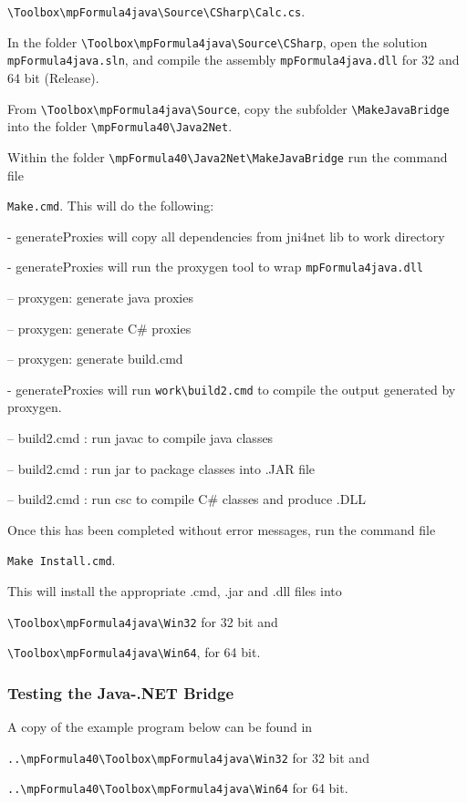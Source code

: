 \verb|\Toolbox\mpFormula4java\Source\CSharp\Calc.cs|.

\vpara
In the folder \verb|\Toolbox\mpFormula4java\Source\CSharp|, open the solution 
\verb|mpFormula4java.sln|, and compile the assembly \verb|mpFormula4java.dll| for 32 and 64 bit (Release). 

\vpara
From \verb|\Toolbox\mpFormula4java\Source|, copy the subfolder \verb|\MakeJavaBridge| into the folder \verb|\mpFormula40\Java2Net|.

\vpara
Within the folder \verb|\mpFormula40\Java2Net\MakeJavaBridge| run the command file 

\verb|Make.cmd|. This will do the following:

- generateProxies will copy all dependencies from jni4net lib to work directory

- generateProxies will run the proxygen tool to wrap \verb|mpFormula4java.dll|

-- proxygen: generate java proxies

-- proxygen: generate C\# proxies

-- proxygen: generate build.cmd

- generateProxies will run \verb|work\build2.cmd|  to compile the output generated by proxygen. 

-- build2.cmd : run javac to compile java classes

-- build2.cmd : run jar to package classes into .JAR file

-- build2.cmd : run csc to compile C\# classes and produce .DLL


\vpara
Once this has been completed without error messages, run the command file 

\verb|Make Install.cmd|.

This will install the appropriate .cmd, .jar and .dll files into

\verb|\Toolbox\mpFormula4java\Win32| for 32 bit and 

\verb|\Toolbox\mpFormula4java\Win64|, for 64 bit.




\subsubsection{Testing the Java-.NET Bridge}

A copy of the example program below can be found in 

\verb|..\mpFormula40\Toolbox\mpFormula4java\Win32| for 32 bit and 

\verb|..\mpFormula40\Toolbox\mpFormula4java\Win64| for 64 bit.

